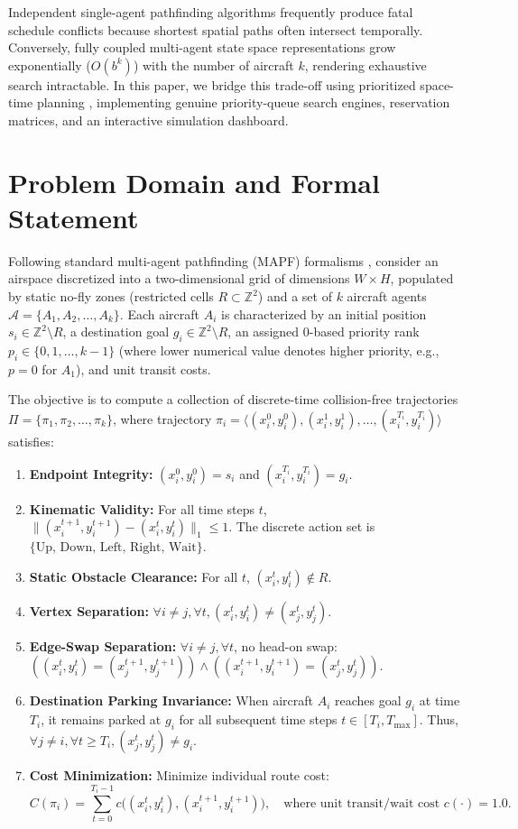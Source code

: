 \documentclass[11pt,a4paper]{article}
\begin{document}
Independent single-agent pathfinding algorithms frequently produce fatal schedule conflicts because shortest spatial paths often intersect temporally. Conversely, fully coupled multi-agent state space representations grow exponentially ($O(b^k)$) with the number of aircraft $k$, rendering exhaustive search intractable. In this paper, we bridge this trade-off using prioritized space-time planning \cite{silver2005}, implementing genuine priority-queue search engines, reservation matrices, and an interactive simulation dashboard.

\section{Problem Domain and Formal Statement}
Following standard multi-agent pathfinding (MAPF) formalisms \cite{stern2019}, consider an airspace discretized into a two-dimensional grid of dimensions $W \times H$, populated by static no-fly zones (restricted cells $R \subset \mathbb{Z}^2$) and a set of $k$ aircraft agents $\mathcal{A} = \{A_1, A_2, \dots, A_k\}$. Each aircraft $A_i$ is characterized by an initial position $s_i \in \mathbb{Z}^2 \setminus R$, a destination goal $g_i \in \mathbb{Z}^2 \setminus R$, an assigned 0-based priority rank $p_i \in \{0, 1, \dots, k-1\}$ (where lower numerical value denotes higher priority, e.g., $p=0$ for $A_1$), and unit transit costs.

The objective is to compute a collection of discrete-time collision-free trajectories $\Pi = \{\pi_1, \pi_2, \dots, \pi_k\}$, where trajectory $\pi_i = \langle (x_i^0, y_i^0), (x_i^1, y_i^1), \dots, (x_i^{T_i}, y_i^{T_i}) \rangle$ satisfies:
\begin{enumerate}
    \item \textbf{Endpoint Integrity:} $(x_i^0, y_i^0) = s_i$ and $(x_i^{T_i}, y_i^{T_i}) = g_i$.
    \item \textbf{Kinematic Validity:} For all time steps $t$, $\|(x_i^{t+1}, y_i^{t+1}) - (x_i^t, y_i^t)\|_1 \le 1$. The discrete action set is $\{\text{Up, Down, Left, Right, Wait}\}$.
    \item \textbf{Static Obstacle Clearance:} For all $t$, $(x_i^t, y_i^t) \notin R$.
    \item \textbf{Vertex Separation:} $\forall i \neq j, \forall t, (x_i^t, y_i^t) \neq (x_j^t, y_j^t)$.
    \item \textbf{Edge-Swap Separation:} $\forall i \neq j, \forall t$, no head-on swap: $((x_i^t, y_i^t) = (x_j^{t+1}, y_j^{t+1})) \land ((x_i^{t+1}, y_i^{t+1}) = (x_j^t, y_j^t))$.
    \item \textbf{Destination Parking Invariance:} When aircraft $A_i$ reaches goal $g_i$ at time $T_i$, it remains parked at $g_i$ for all subsequent time steps $t \in [T_i, T_{\max}]$. Thus, $\forall j \neq i, \forall t \ge T_i, (x_j^t, y_j^t) \neq g_i$.
    \item \textbf{Cost Minimization:} Minimize individual route cost:
    \[
    C(\pi_i) = \sum_{t=0}^{T_i-1} c\big((x_i^t, y_i^t), (x_i^{t+1}, y_i^{t+1})\big), \quad \text{where unit transit/wait cost } c(\cdot) = 1.0.
    \]
\end{enumerate}
\end{document}
